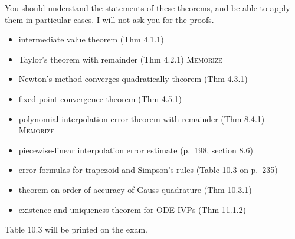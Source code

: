 \documentclass[12pt]{amsart}
\begin{document}
  You should understand the statements of these theorems, and be able to apply them in particular cases.  I will not ask you for the proofs.
  \begin{itemize}
  \item intermediate value theorem (Thm 4.1.1)
  \item Taylor's theorem with remainder (Thm 4.2.1) \qquad  \textsc{Memorize}
  \item Newton's method converges quadratically theorem (Thm 4.3.1)
  \item fixed point convergence theorem (Thm 4.5.1)
  \item polynomial interpolation error theorem with remainder (Thm 8.4.1) \qquad  \textsc{Memorize}
  \item piecewise-linear interpolation error estimate (p.~198, section 8.6)
  \item error formulas for trapezoid and Simpson's rules (Table 10.3 on p.~235)
  \item theorem on order of accuracy of Gauss quadrature (Thm 10.3.1)
  \item existence and uniqueness theorem for ODE IVPs (Thm 11.1.2)
  \end{itemize}
Table 10.3 will be printed on the exam.
\end{document}
